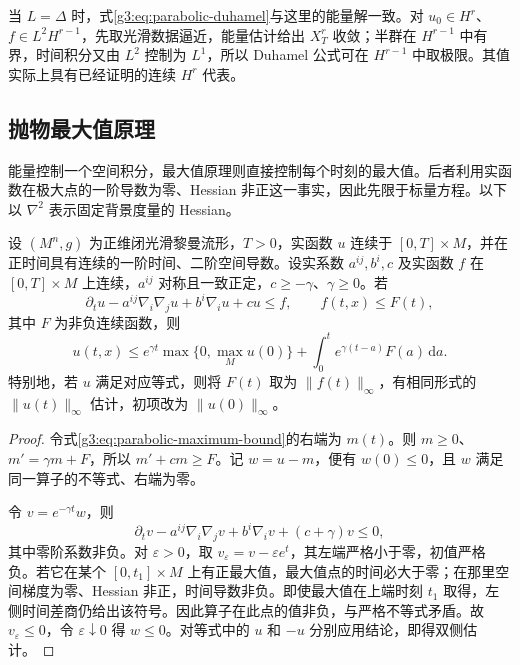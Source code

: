 \ProseParagraphBreak
当 \(L=\Delta\) 时，式\eqref{g3:eq:parabolic-duhamel}与这里的能量解一致。对 \(u_0\in H^r\)、\(f\in L^2H^{r-1}\)，先取光滑数据逼近，能量估计给出 \(X_T^r\) 收敛；半群在 \(H^{r-1}\) 中有界，时间积分又由 \(L^2\) 控制为 \(L^1\)，所以 Duhamel 公式可在 \(H^{r-1}\) 中取极限。其值实际上具有已经证明的连续 \(H^r\) 代表。

\subsection{抛物最大值原理}
\label{g3:subsec:2601:04}
能量控制一个空间积分，最大值原理则直接控制每个时刻的最大值。后者利用实函数在极大点的一阶导数为零、Hessian 非正这一事实，因此先限于标量方程。以下以 \(\nabla^2\) 表示固定背景度量的 Hessian。

\begin{theorem}\label{g3:thm:parabolic-maximum}
	设 \((M^n,g)\) 为正维闭光滑黎曼流形，\(T>0\)，实函数 \(u\) 连续于 \([0,T]\times M\)，并在正时间具有连续的一阶时间、二阶空间导数。设实系数 \(a^{ij},b^i,c\) 及实函数 \(f\) 在 \([0,T]\times M\) 上连续，\(a^{ij}\) 对称且一致正定，\(c\ge-\gamma\)、\(\gamma\ge0\)。若
	\[
		\partial_tu-a^{ij}\nabla_i\nabla_ju+b^i\nabla_i u+cu\le f,
		\qquad f(t,x)\le F(t),
	\]
	其中 \(F\) 为非负连续函数，则
	\begin{equation}\label{g3:eq:parabolic-maximum-bound}
		u(t,x)\le e^{\gamma t}\max\{0,\max_Mu(0)\}
		+\int_0^te^{\gamma(t-a)}F(a)\,\mathrm da.
	\end{equation}
	特别地，若 \(u\) 满足对应等式，则将 \(F(t)\) 取为 \(\|f(t)\|_\infty\)，有相同形式的 \(\|u(t)\|_\infty\) 估计，初项改为 \(\|u(0)\|_\infty\)。
\end{theorem}
\begin{proof}
	令式\eqref{g3:eq:parabolic-maximum-bound}的右端为 \(m(t)\)。则 \(m\ge0\)、\(m'=\gamma m+F\)，所以 \(m'+cm\ge F\)。记 \(w=u-m\)，便有 \(w(0)\le0\)，且 \(w\) 满足同一算子的不等式、右端为零。

	令 \(v=e^{-\gamma t}w\)，则
	\[
		\partial_tv-a^{ij}\nabla_i\nabla_jv+b^i\nabla_iv+(c+\gamma)v\le0,
	\]
	其中零阶系数非负。对 \(\varepsilon>0\)，取 \(v_\varepsilon=v-\varepsilon e^t\)，其左端严格小于零，初值严格负。若它在某个 \([0,t_1]\times M\) 上有正最大值，最大值点的时间必大于零；在那里空间梯度为零、Hessian 非正，时间导数非负。即使最大值在上端时刻 \(t_1\) 取得，左侧时间差商仍给出该符号。因此算子在此点的值非负，与严格不等式矛盾。故 \(v_\varepsilon\le0\)，令 \(\varepsilon\downarrow0\) 得 \(w\le0\)。对等式中的 \(u\) 和 \(-u\) 分别应用结论，即得双侧估计。
\end{proof}

